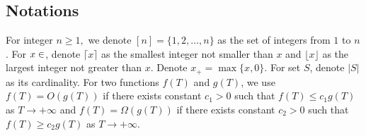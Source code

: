 \subsection{Notations}
For integer $n\ge 1,$ we denote $[n]=\{1,2,\dots,n\}$ as the set of integers from $1$ to $n$. For $x\in\real$, denote $\lceil x\rceil$ as the smallest integer not smaller than $x$ and $\lfloor x\rfloor$ as the largest integer not greater than $x$. Denote $x_+=\max\{x, 0\}$. For set $S$, denote $|S|$ as its cardinality. For two functions $f(T)$ and $g(T)$, we use $f(T)=O(g(T))$ if there exists constant $c_1>0$ such that $f(T)\le c_1g(T)$ as $T\to+\infty$ and $f(T)=\Omega(g(T))$ if there exists constant $c_2>0$ such that $f(T)\ge c_2g(T)$ as $T\to +\infty$. 